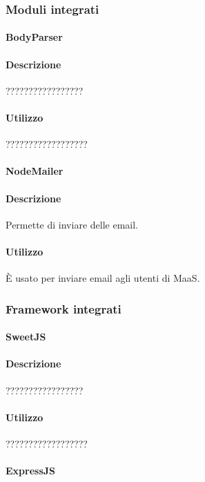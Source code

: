 \subsubsection{Moduli integrati}
\paragraph{BodyParser}
\paragraph*{Descrizione}
?????????????????

\paragraph*{Utilizzo}
??????????????????

\paragraph{NodeMailer}
\paragraph*{Descrizione}
Permette di inviare delle email.

\paragraph*{Utilizzo}
È usato per inviare email agli utenti di MaaS.

\subsubsection{Framework integrati}
\paragraph{SweetJS}
\paragraph*{Descrizione}
?????????????????

\paragraph*{Utilizzo}
??????????????????

\paragraph{ExpressJS}
